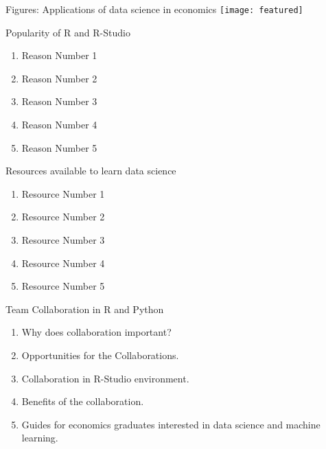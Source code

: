 \documentclass{beamer}
\begin{document}
\begin{frame}{Figures: Applications of data science in economics}
	\texttt{[image: featured]}
	
\end{frame}

\begin{frame}[t]{Popularity of R and R-Studio}
	
	
	\begin{enumerate}
		\item Reason Number 1
		\item  Reason Number 2
		\item  Reason Number 3
		\item Reason Number 4
		\item Reason Number 5
	\end{enumerate}
\end{frame}

\begin{frame}[t]{Resources available to learn data science}
	
	
	\begin{enumerate}
		\item Resource Number 1
		\item  Resource Number 2
		\item  Resource Number 3
		\item Resource Number 4
		\item Resource Number 5
	\end{enumerate}
\end{frame}

\begin{frame}[t]{Team Collaboration in R and Python}
	
	
	\begin{enumerate}
		\item Why does collaboration important?
		\item  Opportunities for the Collaborations.
		\item  Collaboration in R-Studio environment.
		\item Benefits of the collaboration.
		\item Guides for economics graduates interested in data science and machine learning.
	\end{enumerate}
\end{frame}
\end{document}
